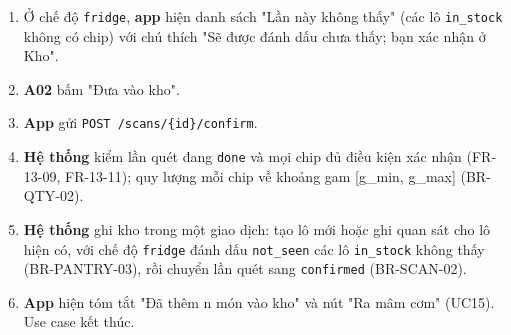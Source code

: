 \begin{enumerate}
\item Ở chế độ {\small\texttt{fridge}}, \textbf{app} hiện danh sách "Lần này không thấy" (các lô {\small\texttt{in\_\allowbreak{}\allowbreak{}stock}} không có chip) với chú thích "Sẽ được đánh dấu chưa thấy; bạn xác nhận ở Kho".
\item \textbf{A02} bấm "Đưa vào kho".
\item \textbf{App} gửi {\small\texttt{POST /\allowbreak{}\allowbreak{}scans/\allowbreak{}\allowbreak{}\{id\}/\allowbreak{}\allowbreak{}confirm}}.
\item \textbf{Hệ thống} kiểm lần quét đang {\small\texttt{done}} và mọi chip đủ điều kiện xác nhận (FR-\allowbreak{}13-\allowbreak{}09, FR-\allowbreak{}13-\allowbreak{}11); quy lượng mỗi chip về khoảng gam [g\_\allowbreak{}min, g\_\allowbreak{}max] (BR-\allowbreak{}QTY-\allowbreak{}02).
\item \textbf{Hệ thống} ghi kho trong một giao dịch: tạo lô mới hoặc ghi quan sát cho lô hiện có, với chế độ {\small\texttt{fridge}} đánh dấu {\small\texttt{not\_\allowbreak{}\allowbreak{}seen}} các lô {\small\texttt{in\_\allowbreak{}\allowbreak{}stock}} không thấy (BR-\allowbreak{}PANTRY-\allowbreak{}03), rồi chuyển lần quét sang {\small\texttt{confirmed}} (BR-\allowbreak{}SCAN-\allowbreak{}02).
\item \textbf{App} hiện tóm tắt "Đã thêm n món vào kho" và nút "Ra mâm cơm" (UC15). Use case kết thúc.
\end{enumerate}
